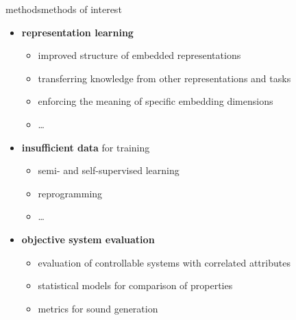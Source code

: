         \begin{frame}{methods}{methods of interest}
            \begin{itemize}
                \item   \textbf{representation learning}
                    \begin{itemize}
                        \item   improved structure of embedded representations %
                        \item   transferring knowledge from other representations and tasks %
                        \item   enforcing the meaning of specific embedding dimensions %
                        \item   \ldots
                    \end{itemize}
                 \bigskip
                 \item<2->  \textbf{insufficient data} for training
                    \begin{itemize}
                        \item   semi- and self-supervised learning %
                        \item   reprogramming %
                        \item   \ldots
                    \end{itemize}
                 \bigskip
                 \item<3->  \textbf{objective system evaluation}
                    \begin{itemize}
                        \item   evaluation of controllable systems with correlated attributes %
                        \item   statistical models for comparison of properties %
                        \item   metrics for sound generation %
                    \end{itemize}
            \end{itemize}
        \end{frame}

